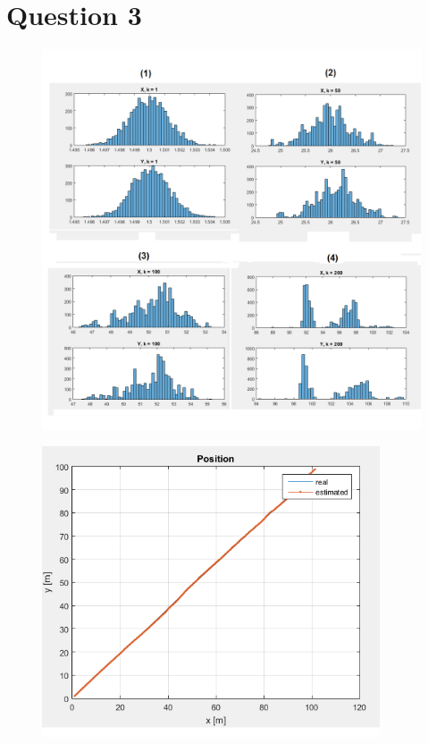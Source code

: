 \documentclass{article}
\begin{document}
\section*{Question 3}
\begin{figure}
   \caption{\label{q3a} }
   \includegraphics[width=\textwidth,height=\textheight,keepaspectratio]{q3a.png}
\end{figure}
\begin{figure}
\begin{center}
   \caption{\label{q3b} }
   \includegraphics[width=10cm,height=\textheight,keepaspectratio]{q3b.png}
\end{center}
\end{figure}
\end{document}
